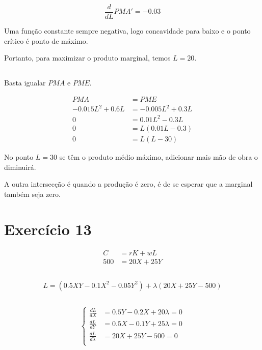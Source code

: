\documentclass{article}
\begin{document}
\[
	\frac{d}{dL}PMA' = - 0.03
\]

Uma função constante sempre negativa, logo concavidade para baixo e o ponto
crítico é ponto de máximo.

Portanto, para maximizar o produto marginal, temos \(L = 20\).

\subsection{}

Basta igualar \(PMA\) e \(PME\).

\[
	\begin{aligned}
		PMA              & = PME              \\
		-0.015L^2 + 0.6L & = -0.005L^2 + 0.3L \\
		0                & = 0.01L^2 - 0.3L   \\
		0                & = L(0.01L - 0.3)   \\
		0                & = L(L - 30)
	\end{aligned}
\]

No ponto \(L=30\) se têm o produto médio máximo, adicionar mais mão de obra o
diminuirá.

A outra intersecção é quando a produção é zero, é de se esperar que a marginal
também seja zero.

\section{Exercício 13}

\[
	\begin{aligned}
		C   & = rK + wL   \\
		500 & = 20X + 25Y
	\end{aligned}
\]

\subsection{}
\[
	L = (0.5XY - 0.1X^2 - 0.05Y^2) + \lambda(20X + 25Y - 500)
\]

\subsection{}
\[
	\left\{
	\begin{aligned}
		\frac{dL}{dX}       & = 0.5Y - 0.2X + 20\lambda = 0 \\
		\frac{dL}{dY}       & = 0.5X - 0.1Y + 25\lambda = 0 \\
		\frac{dL}{d\lambda} & = 20X + 25Y - 500 = 0         \\
	\end{aligned}
	\right.
\]
\end{document}

